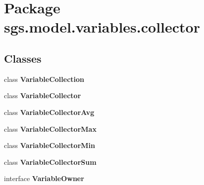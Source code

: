 \section{Package sgs.\-model.\-variables.\-collector}
\label{namespacesgs_1_1model_1_1variables_1_1collector}
\subsection*{Classes}
\begin{DoxyCompactItemize}
\item 
class {\bf Variable\-Collection}
\item 
class {\bf Variable\-Collector}
\item 
class {\bf Variable\-Collector\-Avg}
\item 
class {\bf Variable\-Collector\-Max}
\item 
class {\bf Variable\-Collector\-Min}
\item 
class {\bf Variable\-Collector\-Sum}
\item 
interface {\bf Variable\-Owner}
\end{DoxyCompactItemize}
